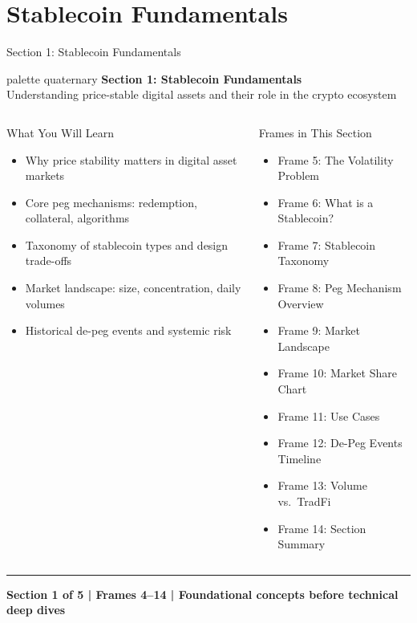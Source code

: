 \documentclass[8pt,aspectratio=169]{beamer}
\newcommand{\bottomnote}[1]{\vfill\vspace{-2mm}\textcolor{mllavender2}{\rule{\textwidth}{0.4pt}}\vspace{1mm}\footnotesize\textbf{#1}}
\begin{document}
\section{Stablecoin Fundamentals}

\begin{frame}{Section 1: Stablecoin Fundamentals}
\begin{beamercolorbox}[sep=12pt,center,rounded=true,shadow=true]{palette quaternary}
  {\Large\bfseries Section 1: Stablecoin Fundamentals}\\[4pt]
  {\normalsize Understanding price-stable digital assets and their role in the crypto ecosystem}
\end{beamercolorbox}

\vspace{4mm}
\begin{columns}[T]
\begin{block}{What You Will Learn}
\begin{itemize}\setlength{\itemsep}{2pt}
  \item Why price stability matters in digital asset markets
  \item Core peg mechanisms: redemption, collateral, algorithms
  \item Taxonomy of stablecoin types and design trade-offs
  \item Market landscape: size, concentration, daily volumes
  \item Historical de-peg events and systemic risk
\end{itemize}
\end{block}
\begin{block}{Frames in This Section}
\begin{itemize}\setlength{\itemsep}{2pt}
  \item Frame 5: The Volatility Problem
  \item Frame 6: What is a Stablecoin?
  \item Frame 7: Stablecoin Taxonomy
  \item Frame 8: Peg Mechanism Overview
  \item Frame 9: Market Landscape
  \item Frame 10: Market Share Chart
  \item Frame 11: Use Cases
  \item Frame 12: De-Peg Events Timeline
  \item Frame 13: Volume vs.\ TradFi
  \item Frame 14: Section Summary
\end{itemize}
\end{block}
\end{columns}
\bottomnote{Section 1 of 5 | Frames 4--14 | Foundational concepts before technical deep dives}
\end{frame}
\end{document}
